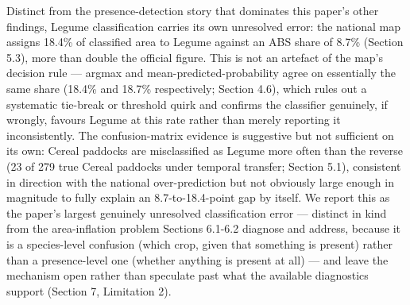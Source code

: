 Distinct from the presence-detection story that dominates this paper's other findings, Legume classification carries its own unresolved error: the national map assigns 18.4\% of classified area to Legume against an ABS share of 8.7\% (Section 5.3), more than double the official figure. This is not an artefact of the map's decision rule --- argmax and mean-predicted-probability agree on essentially the same share (18.4\% and 18.7\% respectively; Section 4.6), which rules out a systematic tie-break or threshold quirk and confirms the classifier genuinely, if wrongly, favours Legume at this rate rather than merely reporting it inconsistently. The confusion-matrix evidence is suggestive but not sufficient on its own: Cereal paddocks are misclassified as Legume more often than the reverse (23 of 279 true Cereal paddocks under temporal transfer; Section 5.1), consistent in direction with the national over-prediction but not obviously large enough in magnitude to fully explain an 8.7-to-18.4-point gap by itself. We report this as the paper's largest genuinely unresolved classification error --- distinct in kind from the area-inflation problem Sections 6.1-6.2 diagnose and address, because it is a species-level confusion (which crop, given that something is present) rather than a presence-level one (whether anything is present at all) --- and leave the mechanism open rather than speculate past what the available diagnostics support (Section 7, Limitation 2).

